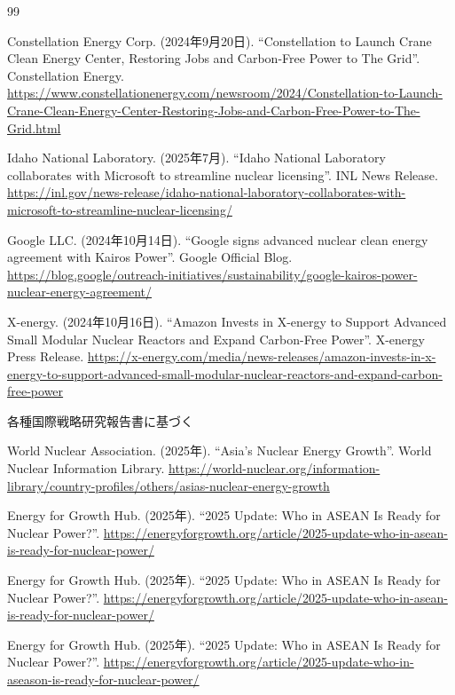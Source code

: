 \documentclass[10pt,a4paper]{jsarticle}
\begin{document}
\newpage

\begin{thebibliography}{99}

Constellation Energy Corp. (2024年9月20日). ``Constellation to Launch Crane Clean Energy Center, Restoring Jobs and Carbon-Free Power to The Grid''. Constellation Energy. \url{https://www.constellationenergy.com/newsroom/2024/Constellation-to-Launch-Crane-Clean-Energy-Center-Restoring-Jobs-and-Carbon-Free-Power-to-The-Grid.html}

Idaho National Laboratory. (2025年7月). ``Idaho National Laboratory collaborates with Microsoft to streamline nuclear licensing''. INL News Release. \url{https://inl.gov/news-release/idaho-national-laboratory-collaborates-with-microsoft-to-streamline-nuclear-licensing/}

Google LLC. (2024年10月14日). ``Google signs advanced nuclear clean energy agreement with Kairos Power''. Google Official Blog. \url{https://blog.google/outreach-initiatives/sustainability/google-kairos-power-nuclear-energy-agreement/}

X-energy. (2024年10月16日). ``Amazon Invests in X-energy to Support Advanced Small Modular Nuclear Reactors and Expand Carbon-Free Power''. X-energy Press Release. \url{https://x-energy.com/media/news-releases/amazon-invests-in-x-energy-to-support-advanced-small-modular-nuclear-reactors-and-expand-carbon-free-power}

各種国際戦略研究報告書に基づく

World Nuclear Association. (2025年). ``Asia's Nuclear Energy Growth''. World Nuclear Information Library. \url{https://world-nuclear.org/information-library/country-profiles/others/asias-nuclear-energy-growth}

Energy for Growth Hub. (2025年). ``2025 Update: Who in ASEAN Is Ready for Nuclear Power?''. \url{https://energyforgrowth.org/article/2025-update-who-in-asean-is-ready-for-nuclear-power/}

Energy for Growth Hub. (2025年). ``2025 Update: Who in ASEAN Is Ready for Nuclear Power?''. \url{https://energyforgrowth.org/article/2025-update-who-in-asean-is-ready-for-nuclear-power/}

Energy for Growth Hub. (2025年). ``2025 Update: Who in ASEAN Is Ready for Nuclear Power?''. \url{https://energyforgrowth.org/article/2025-update-who-in-aseason-is-ready-for-nuclear-power/}


\end{thebibliography}
\end{document}
